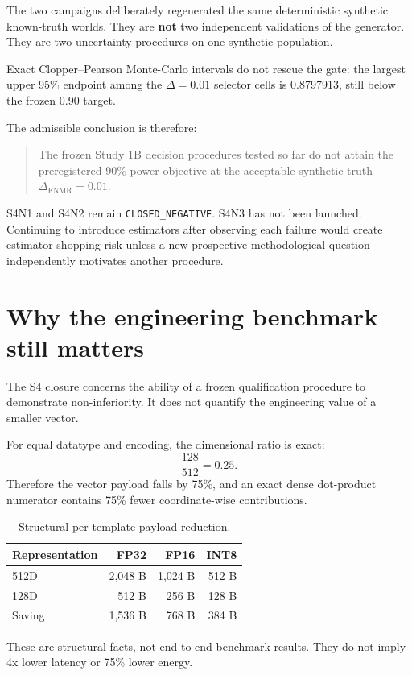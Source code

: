 \documentclass[10pt,a4paper]{article}
\newcommand{\fnmr}{\mathrm{FNMR}}
\newcommand{\DeltaFNMR}{\Delta_{\fnmr}}
\newcommand{\code}[1]{\texttt{#1}}
\begin{document}
The two campaigns deliberately regenerated the same deterministic synthetic known-truth worlds. They are
\textbf{not} two independent validations of the generator. They are two uncertainty procedures on one synthetic
population.

Exact Clopper--Pearson Monte-Carlo intervals do not rescue the gate: the largest upper 95\% endpoint among the
$\Delta=0.01$ selector cells is 0.8797913, still below the frozen 0.90 target.

The admissible conclusion is therefore:
\begin{quote}
The frozen Study 1B decision procedures tested so far do not attain the preregistered 90\% power objective at
the acceptable synthetic truth $\DeltaFNMR=0.01$.
\end{quote}

S4N1 and S4N2 remain \code{CLOSED\_NEGATIVE}. S4N3 has not been launched. Continuing to introduce estimators
after observing each failure would create estimator-shopping risk unless a new prospective methodological
question independently motivates another procedure.

\section{Why the engineering benchmark still matters}

The S4 closure concerns the ability of a frozen qualification procedure to demonstrate non-inferiority.
It does not quantify the engineering value of a smaller vector.

For equal datatype and encoding, the dimensional ratio is exact:
\[
\frac{128}{512}=0.25.
\]
Therefore the vector payload falls by 75\%, and an exact dense dot-product numerator contains 75\% fewer
coordinate-wise contributions.

\begin{table}[ht]
\centering
\begin{tabular}{lrrr}
\toprule
\textbf{Representation} & \textbf{FP32} & \textbf{FP16} & \textbf{INT8}\\
\midrule
512D & 2,048 B & 1,024 B & 512 B\\
128D & 512 B & 256 B & 128 B\\
Saving & 1,536 B & 768 B & 384 B\\
\bottomrule
\end{tabular}
\caption{Structural per-template payload reduction.}
\end{table}

These are structural facts, not end-to-end benchmark results. They do not imply 4x lower latency or 75\%
lower energy.
\end{document}
